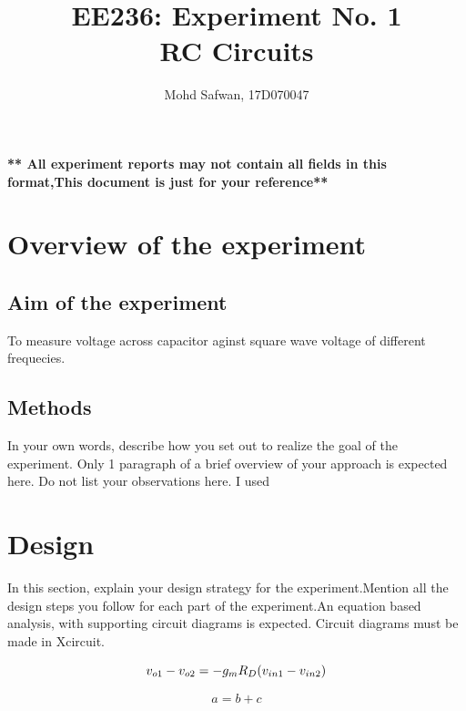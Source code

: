 \documentclass[12pt]{article}
\title{EE236: Experiment No. 1\\
RC Circuits}
\author{Mohd Safwan, 17D070047}
\begin{document}
\maketitle

\textbf{ ** All experiment reports may not contain all fields in this format,This document is just for your reference**} 

\section{Overview of the experiment} %

\subsection{Aim of the experiment}%

To measure voltage across capacitor aginst square wave voltage of different frequecies.

\subsection{Methods}




In your own words, describe how you set out to realize the goal of the experiment. Only 1 paragraph of a brief overview of your approach is expected here. Do not list your observations here.
I used 

\section{Design}%

In this section, explain your design strategy for the experiment.Mention all the design steps you follow for each part of the experiment.An equation based analysis, with supporting circuit diagrams is expected. Circuit diagrams must be made in Xcircuit.
 
 \begin{equation}
     v_{o1}-v_{o2}
     \newline
     = -g_mR_D(v_{in1}-v_{in2})
 \end{equation}     
 
 \begin{equation}
     a=b+c
 \end{equation}     
\end{document}
